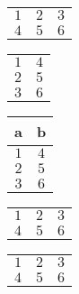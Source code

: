 \begin{table}[htp]
  \begin{center}
    \begin{tabular}{ccc}
      \toprule
      $1$ & $2$ & $3$\\
      $4$ & $5$ & $6$\\
      \bottomrule
    \end{tabular}
  \end{center}
\end{table}
\begin{table}[htp]
  \begin{center}
    \begin{tabular}{cc}
      \toprule
      $1$ & $4$\\
      $2$ & $5$\\
      $3$ & $6$\\
      \bottomrule
    \end{tabular}
  \end{center}
\end{table}
\begin{table}[htp]
  \begin{center}
    \begin{tabular}{cc}
      \toprule
      {a} & {b}\\
      \midrule
      $1$ & $4$\\
      $2$ & $5$\\
      $3$ & $6$\\
      \bottomrule
    \end{tabular}
  \end{center}
\end{table}
\begin{table}[htp]
  \begin{center}
    \label{tab:tmp}
    \begin{tabular}{ccc}
      \toprule
      $1$ & $2$ & $3$\\
      $4$ & $5$ & $6$\\
      \bottomrule
    \end{tabular}
  \end{center}
\end{table}
\begin{table}[htp]
  \begin{center}
    \begin{tabular}{ccc}
      \toprule
      $1$ & $2$ & $3$\\
      $4$ & $5$ & $6$\\
      \bottomrule
    \end{tabular}
  \end{center}
\end{table}
